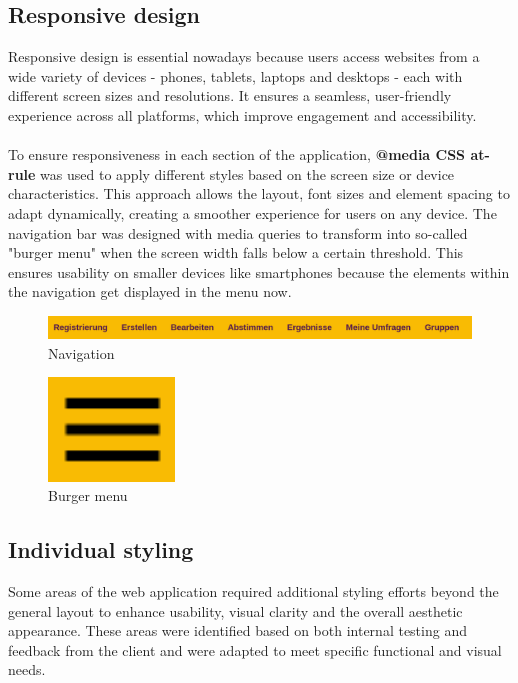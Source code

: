 \documentclass[a4paper,12pt]{report}
\begin{document}
\subsection{Responsive design}
Responsive design is essential nowadays because users access websites from a wide variety of devices - phones, tablets, laptops and desktops - each with different screen sizes and resolutions. It ensures a seamless, user-friendly experience across all platforms, which improve engagement and accessibility.\\ \\
To ensure responsiveness in each section of the application, \textbf{@media CSS at-rule} was used to apply different styles based on the screen size or device characteristics. This approach allows the layout, font sizes and element spacing to adapt dynamically, creating a smoother experience for users on any device. The navigation bar was designed with media queries to transform into so-called "burger menu" when the screen width falls below a certain threshold. This ensures usability on smaller devices like smartphones because the elements within the navigation get displayed in the menu now.
\begin{figure}[h!]
	\centering
	\includegraphics[width=1\textwidth]{pics/navigation.png}
	\caption{Navigation}
	\label{fig:navigation}
\end{figure}
\begin{figure}[H]
	\centering
	\includegraphics[width=0.3\textwidth]{pics/burger_menu.png}
	\caption{Burger menu}
	\label{fig:burger_menu}
\end{figure}
\subsection{Individual styling}
Some areas of the web application required additional styling efforts beyond the general layout to enhance usability, visual clarity and the overall aesthetic appearance. These areas were identified based on both internal testing and feedback from the client and were adapted to meet specific functional and visual needs.
\end{document}
